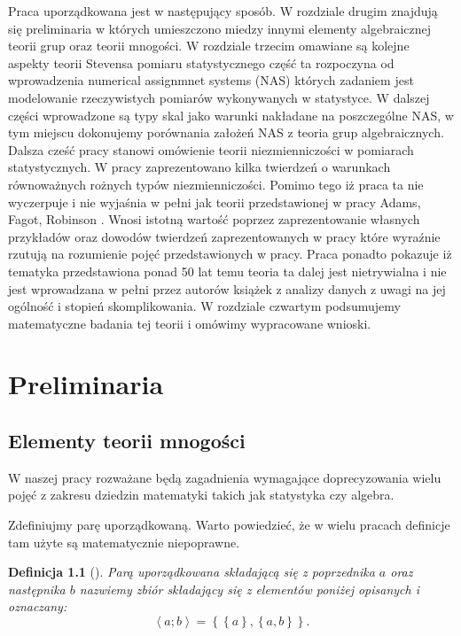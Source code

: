 \documentclass[12pt,a4paper]{report}
\newtheorem{definition}{Definicja}[chapter]
\newcommand{\parauporzadkowana}[2]{\left\langle {#1}; {#2} \right\rangle}
\newcommand{\zbior}[1]{\left\lbrace {#1} \right\rbrace }
\begin{document}
Praca uporządkowana jest w następujący sposób. W rozdziale drugim znajdują się preliminaria w których umieszczono miedzy innymi elementy algebraicznej teorii grup oraz teorii mnogości. W rozdziale trzecim omawiane są kolejne aspekty teorii Stevensa pomiaru statystycznego część ta rozpoczyna od wprowadzenia numerical assignmnet systems (NAS) których zadaniem jest modelowanie rzeczywistych pomiarów wykonywanych w statystyce. W dalszej części wprowadzone są typy skal jako warunki nakładane na poszczególne NAS, w tym miejscu dokonujemy porównania założeń NAS  z teoria grup algebraicznych. Dalsza cześć pracy stanowi omówienie teorii niezmienniczości w pomiarach statystycznych. W pracy zaprezentowano kilka twierdzeń o warunkach równoważnych rożnych typów niezmienniczości. Pomimo tego iż praca ta nie wyczerpuje i nie wyjaśnia w pełni jak teorii przedstawionej w pracy Adams, Fagot, Robinson {\citep{adams1965theory}}. Wnosi istotną wartość poprzez zaprezentowanie własnych przykładów oraz dowodów twierdzeń zaprezentowanych w pracy które wyraźnie rzutują na rozumienie pojęć przedstawionych w pracy. Praca ponadto pokazuje iż tematyka przedstawiona ponad 50 lat temu teoria ta dalej jest nietrywialna i nie jest wprowadzana w pełni przez autorów książek z analizy danych z uwagi na jej ogólność i stopień skomplikowania. W rozdziale czwartym podsumujemy  matematyczne badania tej teorii i omówimy wypracowane wnioski.

\chapter{Preliminaria}


\section{Elementy teorii mnogości}
W naszej pracy rozważane będą zagadnienia wymagające doprecyzowania wielu pojęć z zakresu dziedzin matematyki takich jak statystyka czy algebra. 


Zdefiniujmy parę uporządkowaną. Warto powiedzieć, że w wielu pracach definicje tam użyte są matematycznie niepoprawne.

\begin{definition}[{\citep[Sec 3.3]{kuratowski1966wstkep}}]
Parą uporządkowana składającą się z poprzednika $a$ oraz następnika $b$ nazwiemy zbiór składający się z elementów poniżej opisanych i oznaczany:
\begin{equation*}
\parauporzadkowana{a}{b}=\zbior{\zbior{a}, \zbior{a,b}}.
\end{equation*}

\end{definition}
\end{document}
